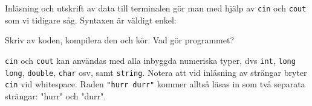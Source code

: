 Inläsning och utskrift av data till terminalen gör man med hjälp av \texttt{cin} och \texttt{cout} som vi tidigare såg. Syntaxen är väldigt enkel:



Skriv av koden, kompilera den och kör. Vad gör programmet?

\texttt{cin} och \texttt{cout} kan användas med alla inbyggda numeriska typer, dvs \texttt{int}, \texttt{long long}, \texttt{double}, \texttt{char} osv, samt \texttt{string}. Notera att vid inläsning av strängar bryter \texttt{cin} vid whitespace. Raden \texttt{"hurr durr"} kommer alltså läsas in som två separata strängar: "hurr" och "durr".
